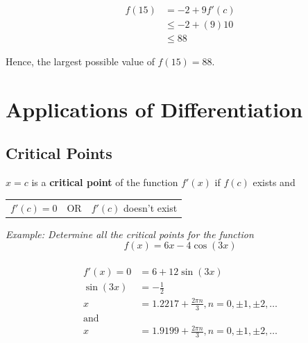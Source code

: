 \documentclass{article}
\begin{document}
            \begin{align*}
                f(15) &= -2 + 9f'(c) \\
                &\leq -2 + (9)10 \\
                &\leq 88
            \end{align*}

            \noindent Hence, the largest possible value of $f(15)=88$.

    \pagebreak

    \section{Applications of Differentiation}

        \subsection{Critical Points}
            $x=c$ is a \textbf{critical point} of the function $f'(x)$ if $f(c)$ exists and \\

            \begin{center}
                \begin{tabular}{ccc}
                    $f'(c) = 0$ & OR & $f'(c)$ doesn't exist
                \end{tabular}
            \end{center}

            \noindent \color{blue} \textit{Example: Determine all the critical points for the function} \\

            \begin{equation*}
                f(x) = 6x - 4\cos{(3x)}
            \end{equation*} \color{black} \\

            \begin{align*}
                f'(x) = 0 &= 6 + 12\sin{(3x)} \\
                \sin{(3x)} &= -\frac{1}{2} \\
                x &= 1.2217+\frac{2\pi n}{3}, n=0,\pm 1,\pm 2,\dots \\
                \text{and} \\
                x &= 1.9199+\frac{2\pi n}{3}, n=0,\pm 1,\pm 2,\dots
            \end{align*}
\end{document}
